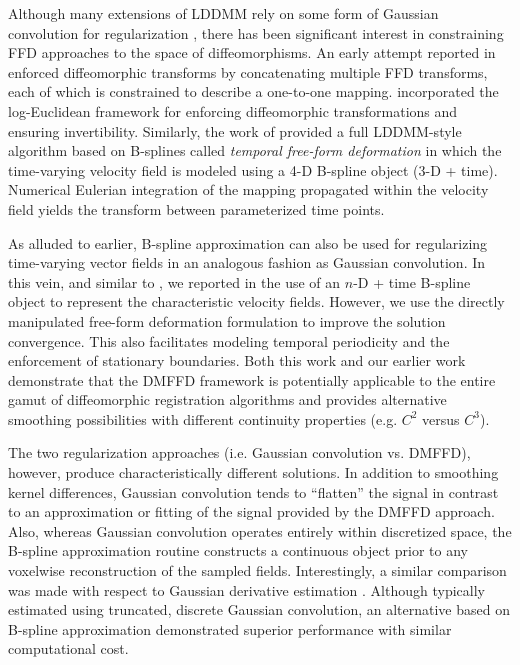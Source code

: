 \documentclass{frontiersSCNS}
\begin{document}


Although many extensions of LDDMM rely on some form of Gaussian
convolution for regularization \citep[e.g.][]{risser2011}, there has
been significant interest in constraining FFD approaches to the space
of diffeomorphisms.  An early attempt reported in \cite{rueckert2006}
enforced diffeomorphic transforms by concatenating multiple FFD
transforms, each of which is constrained to describe a one-to-one
mapping.  \cite{modat2011} incorporated the log-Euclidean framework
for enforcing diffeomorphic transformations and ensuring
invertibility.  Similarly, the work of \cite{de-craene2011} provided a
full LDDMM-style algorithm based on B-splines called {\it temporal
free-form deformation} in which the time-varying velocity field is
modeled using a 4-D B-spline object (3-D + time).  Numerical Eulerian
integration of the mapping propagated within the velocity field yields
the transform between parameterized time points.

As alluded to earlier, B-spline approximation can also be used for
regularizing time-varying vector fields in an analogous fashion as
Gaussian convolution.  In this vein, and similar to
\cite{de-craene2011}, we reported in \cite{tustison2012a,tustison2012}
the use of an $n$-D + time B-spline object to represent the
characteristic velocity fields.  However, we use the directly
manipulated free-form deformation formulation to improve the solution
convergence.  This also facilitates modeling temporal periodicity and
the enforcement of stationary boundaries.  Both this work and our
earlier work \citep{tustison2009} demonstrate that the DMFFD framework
is potentially applicable to the entire gamut of diffeomorphic
registration algorithms and provides alternative smoothing 
possibilities with different continuity properties (e.g. $C^2$
versus $C^3$).  

The two regularization approaches (i.e. Gaussian convolution vs. DMFFD), 
however,  produce characteristically
different solutions.  In addition to smoothing kernel differences,
Gaussian convolution tends to ``flatten'' the signal in contrast to an
approximation or fitting of the signal provided by the DMFFD approach.
Also, whereas Gaussian convolution operates entirely within
discretized space, the B-spline approximation routine constructs a
continuous object prior to any voxelwise reconstruction of the sampled
fields.  Interestingly, a similar comparison was made with respect to
Gaussian derivative estimation \citep{bourma2007}.  Although typically
estimated using truncated, discrete Gaussian convolution, an
alternative based on B-spline approximation demonstrated superior
performance with similar computational cost.
\end{document}
